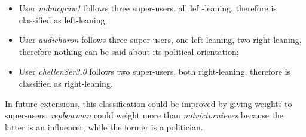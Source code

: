 \begin{itemize}
    \item User \textit{mdmcgraw1} follows three super-users, all left-leaning, therefore is classified as left-leaning;
    \item User \textit{audicharon} follows three super-users, one left-leaning, two right-leaning, therefore nothing can be said about its political orientation;
    \item User \textit{chellen8er3.0} follows two super-users, both right-leaning, therefore is classified as right-leaning.
\end{itemize}

In future extensions, this classification could be improved by giving weights to super-users: \textit{repbowman} could weight more than \textit{notvictornieves} because the latter is an influencer, while the former is a politician.